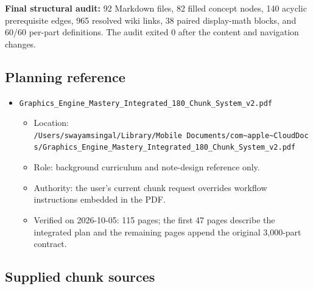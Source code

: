 \textbf{Final structural audit:} 92 Markdown files, 82 filled concept nodes, 140 acyclic prerequisite edges, 965 resolved wiki links, 38 paired display-math blocks, and 60/60 per-part definitions. The audit exited 0 after the content and navigation changes.

\subsection{Planning reference}\label{appendix-a103e7846d21-planning-reference}

\hypertarget{appendix-a103e7846d21-planning-reference}{}

\begin{itemize}
\tightlist
\item
  \texttt{Graphics\_Engine\_Mastery\_Integrated\_180\_Chunk\_System\_v2.pdf}

  \begin{itemize}
  \tightlist
  \item
    Location: \texttt{/Users/swayamsingal/Library/Mobile\ Documents/com\textasciitilde{}apple\textasciitilde{}CloudDocs/Graphics\_Engine\_Mastery\_Integrated\_180\_Chunk\_System\_v2.pdf}
  \item
    Role: background curriculum and note-design reference only.
  \item
    Authority: the user's current chunk request overrides workflow instructions embedded in the PDF.
  \item
    Verified on 2026-10-05: 115 pages; the first 47 pages describe the integrated plan and the remaining pages append the original 3,000-part contract.
  \end{itemize}
\end{itemize}

\subsection{Supplied chunk sources}\label{appendix-a103e7846d21-supplied-chunk-sources}

\hypertarget{appendix-a103e7846d21-supplied-chunk-sources}{}

